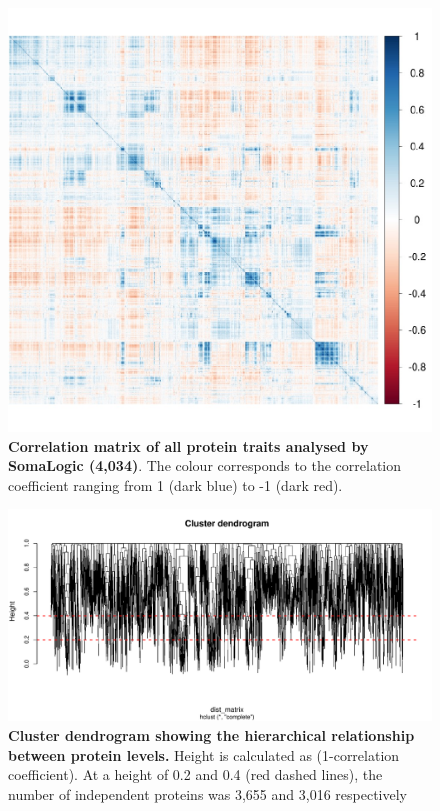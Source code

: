 \documentclass[11pt,twoside]{bristolthesis}
\newcommand{\blandscape}{\begin{landscape}}
\newcommand{\elandscape}{\end{landscape}}
\begin{document}
\begin{figure}
\includegraphics[width=0.9\linewidth]{figure/BMI_protein_INTERVAL/Correlation_matrix_proteins} \caption[Correlation matrix of all protein traits analysed by SomaLogic]{\textbf{Correlation matrix of all protein traits analysed by SomaLogic (4,034)}. The colour corresponds to the correlation coefficient ranging from 1 (dark blue) to -1 (dark red).}\label{fig:Corr-mat-proteins}
\end{figure}
\blandscape



\begin{figure}
\includegraphics[width=0.95\linewidth]{figure/BMI_protein_INTERVAL/dendrogram} \caption[Cluster dendrogram showing the hierarchical relationship between protein levels]{\textbf{Cluster dendrogram showing the hierarchical relationship between protein levels.} Height is calculated as (1-correlation coefficient). At a height of 0.2 and 0.4 (red dashed lines), the number of independent proteins was 3,655 and 3,016 respectively}\label{fig:Dend-proteins}
\end{figure}
\elandscape
\end{document}
